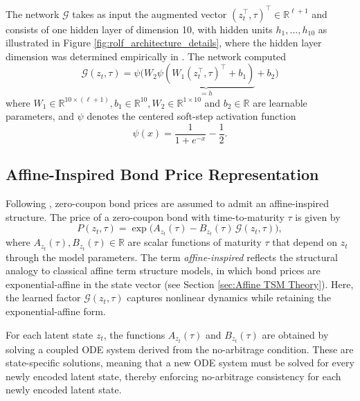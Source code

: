 The network $\mathcal{G}$ takes as input the augmented vector $(z_t^\top,\tau)^\top\in\mathbb{R}^{\ell+1}$ and consists of one hidden layer of dimension 10, with hidden units $h_1,...,h_{10}$ as illustrated in Figure \ref{fig:rolf_architecture_details}, where the hidden layer dimension was determined empirically in \cite{MatinWanPoulsen2025}. The network computed
$$\mathcal{G}(z_t,\tau)=\psi\bigg(W_2\underbrace{\psi\left(W_1
(z_t^\top,\tau)^\top+b_1\right)}_{=h}+b_2\bigg)$$
where $W_1\in\mathbb{R}^{10\times(\ell+1)},b_1\in\mathbb{R}^{10},W_2\in\mathbb{R}^{1\times 10}$ and $b_2\in\mathbb{R}$ are learnable parameters, and $\psi$ denotes the centered soft-step activation function
\begin{equation}
    \psi(x)=\frac{1}{1+e^{-x}}-\frac{1}{2}.
    \label{eq:activation}
\end{equation}



\subsection{Affine-Inspired Bond Price Representation}

Following \citet{MatinWanPoulsen2025}, zero-coupon bond prices are assumed to admit an affine-inspired structure. The price of a zero-coupon bond with time-to-maturity $\tau$ is given by
\begin{equation}
P(z_t,\tau)
=
\exp\!\Big(A_{z_t}(\tau)-B_{z_t}(\tau)\,\mathcal{G}(z_t,\tau)\Big),
\label{affineinspiredzcbprices}
\end{equation}
where $A_{z_t}(\tau),B_{z_t}(\tau)\in\mathbb{R}$ are scalar functions of maturity $\tau$ that depend on $z_t$ through the model parameters. The term \textit{affine-inspired} reflects the structural analogy to classical affine term structure models, in which bond prices are exponential-affine in the state vector (see Section \ref{sec:Affine TSM Theory}). Here, the learned factor $\mathcal{G}(z_t,\tau)$ captures nonlinear dynamics while retaining the  exponential-affine form.


For each latent state $z_t$, the functions $A_{z_t}(\tau)$ and $B_{z_t}(\tau)$ are obtained by solving a coupled ODE system derived from the no-arbitrage condition. These are state-specific solutions, meaning that a new ODE system must be solved for every newly encoded latent state, thereby enforcing no-arbitrage consistency for each newly encoded latent state.

